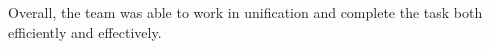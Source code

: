 Overall, the team was able to work in unification and complete the task both efficiently and effectively. 